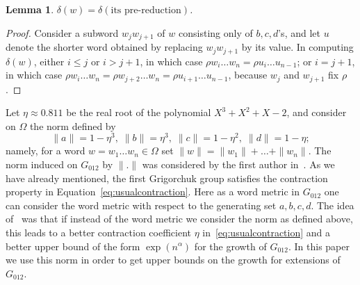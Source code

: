 \documentclass{amsart}
\newcommand\Grig{{G_{012}}}
\newtheorem{lemma}{Lemma}[section]
\theoremstyle{definition}
\begin{document}
\begin{lemma}
  $\delta(w)=\delta(\text{its pre-reduction})$.
\end{lemma}
\begin{proof}
  Consider a subword $w_jw_{j+1}$ of $w$ consisting only of $b,c,d$'s,
  and let $u$ denote the shorter word obtained by replacing
  $w_jw_{j+1}$ by its value. In computing $\delta(w)$, either $i\le j$ or
  $i>j+1$, in which case $\rho w_i\dots w_n=\rho u_i\dots u_{n-1}$; or
  $i=j+1$, in which case $\rho w_i\dots w_n=\rho w_{j+2}\dots w_n=\rho
  u_{i+1}\dots u_{n-1}$, because $w_j$ and $w_{j+1}$ fix $\rho$.
\end{proof}

Let $\eta\approx0.811$ be the real root of the polynomial
$X^3+X^2+X-2$, and consider on $\Omega$ the norm defined by
\[\|a\|=1-\eta^3,\;\|b\|=\eta^3,\;\|c\|=1-\eta^2,\;\|d\|=1-\eta;\]
namely, for a word $w=w_1\dots w_n\in\Omega$ set
$\|w\|=\|w_1\|+\dots+\|w_n\|$.  The norm induced on $\Grig$ by $\|.\|$
was considered by the first author in~\cite{bartholdi:upperbd}.  As we
have already mentioned, the first Grigorchuk group satisfies the
contraction property in Equation~\eqref{eq:usualcontraction}. Here as
a word metric in $\Grig$ one can consider the word metric with respect
to the generating set $a,b,c,d$.  The idea of~\cite{bartholdi:upperbd}
was that if instead of the word metric we consider the norm as defined
above, this leads to a better contraction coefficient $\eta$
in~\eqref{eq:usualcontraction} and a better upper bound of the form
$\exp(n^\alpha)$ for the growth of $\Grig$. In this paper we use this
norm in order to get upper bounds on the growth for extensions of
$\Grig$.
\end{document}
